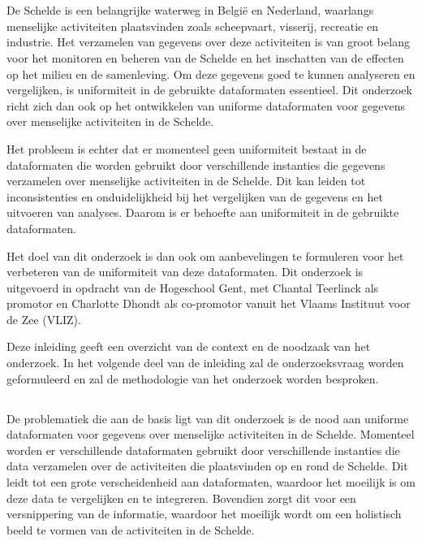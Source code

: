 
\chapter{}%
\label{ch:inleiding}

De Schelde is een belangrijke waterweg in België en Nederland, waarlangs menselijke activiteiten plaatsvinden zoals scheepvaart, visserij, recreatie en industrie. Het verzamelen van gegevens over deze activiteiten is van groot belang voor het monitoren en beheren van de Schelde en het inschatten van de effecten op het milieu en de samenleving. Om deze gegevens goed te kunnen analyseren en vergelijken, is uniformiteit in de gebruikte dataformaten essentieel. Dit onderzoek richt zich dan ook op het ontwikkelen van uniforme dataformaten voor gegevens over menselijke activiteiten in de Schelde.

Het probleem is echter dat er momenteel geen uniformiteit bestaat in de dataformaten die worden gebruikt door verschillende instanties die gegevens verzamelen over menselijke activiteiten in de Schelde. Dit kan leiden tot inconsistenties en onduidelijkheid bij het vergelijken van de gegevens en het uitvoeren van analyses. Daarom is er behoefte aan uniformiteit in de gebruikte dataformaten.

Het doel van dit onderzoek is dan ook om aanbevelingen te formuleren voor het verbeteren van de uniformiteit van deze dataformaten. Dit onderzoek is uitgevoerd in opdracht van de Hogeschool Gent, met Chantal Teerlinck als promotor en Charlotte Dhondt als co-promotor vanuit het Vlaams Instituut voor de Zee (VLIZ).

Deze inleiding geeft een overzicht van de context en de noodzaak van het onderzoek. In het volgende deel van de inleiding zal de onderzoeksvraag worden geformuleerd en zal de methodologie van het onderzoek worden besproken.

\section{}%
\label{sec:probleemstelling}

De problematiek die aan de basis ligt van dit onderzoek is de nood aan uniforme dataformaten voor gegevens over menselijke activiteiten in de Schelde. Momenteel worden er verschillende dataformaten gebruikt door verschillende instanties die data verzamelen over de activiteiten die plaatsvinden op en rond de Schelde. Dit leidt tot een grote verscheidenheid aan dataformaten, waardoor het moeilijk is om deze data te vergelijken en te integreren. Bovendien zorgt dit voor een versnippering van de informatie, waardoor het moeilijk wordt om een holistisch beeld te vormen van de activiteiten in de Schelde.


